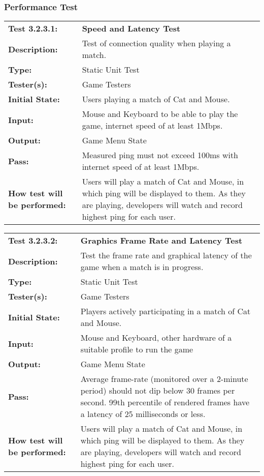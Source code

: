 \documentclass[12pt, titlepage]{article}
\begin{document}
\newpage
\subsubsection{Performance Test}
\begin{mdframed}[linewidth=1pt]
\begin{tabularx}{\textwidth}{@{}p{3cm}X@{}}
{\bf Test 3.2.3.1:} & {\bf Speed and Latency Test}\\[\baselineskip]
{\bf Description:} & Test of connection quality when playing a match.\\[0.5\baselineskip]
{\bf Type:} & Static Unit Test\\[0.5\baselineskip]
{\bf Tester(s):} & Game Testers\\[0.5\baselineskip]
{\bf Initial State:} & Users playing a match of Cat and Mouse. \\[0.5\baselineskip]
{\bf Input:} & Mouse and Keyboard to be able to play the game, internet speed of at least 1Mbps.\\[0.5\baselineskip]
{\bf Output:} & Game Menu State\\[0.5\baselineskip]
{\bf Pass:} & Measured ping must not exceed 100ms with internet speed of at least 1Mbps.\\[0.5\baselineskip]
{\bf How test will be performed:} & Users will play a match of Cat and Mouse, in which ping will be displayed to them. As they are playing, developers will watch and record highest ping for each user. 
\end{tabularx}
\end{mdframed}

\begin{mdframed}[linewidth=1pt]
\begin{tabularx}{\textwidth}{@{}p{3cm}X@{}}
{\bf Test 3.2.3.2:} & {\bf Graphics Frame Rate and Latency Test}\\[\baselineskip]
{\bf Description:} & Test the frame rate and graphical latency of the game when a match is in progress. \\[0.5\baselineskip]
{\bf Type:} & Static Unit Test\\[0.5\baselineskip]
{\bf Tester(s):} & Game Testers\\[0.5\baselineskip]
{\bf Initial State:} & Players actively participating in a match of Cat and Mouse. \\[0.5\baselineskip]
{\bf Input:} & Mouse and Keyboard, other hardware of a suitable profile to run the game\\[0.5\baselineskip]
{\bf Output:} & Game Menu State\\[0.5\baselineskip]
{\bf Pass:} & Average frame-rate (monitored over a 2-minute period) should not dip below 30 frames per second. 99th percentile of rendered frames have a latency of 25 milliseconds or less. \\[0.5\baselineskip]
{\bf How test will be performed:} & Users will play a match of Cat and Mouse, in which ping will be displayed to them. As they are playing, developers will watch and record highest ping for each user. 
\end{tabularx}
\end{mdframed}
\end{document}
